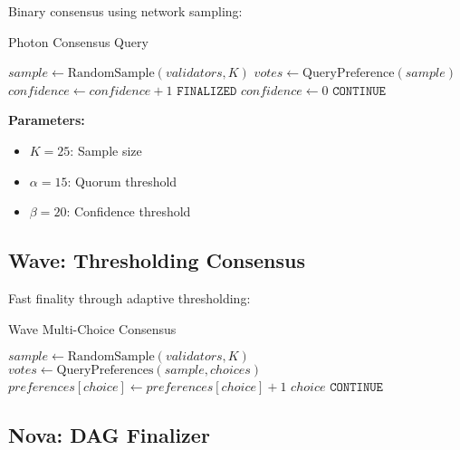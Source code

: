 \documentclass[11pt]{article}
\begin{document}
Binary consensus using network sampling:

\begin{algorithm}[H]
\caption{Photon Consensus Query}
\begin{algorithmic}[1]
    \State $sample \gets \text{RandomSample}(validators, K)$
    \State $votes \gets \text{QueryPreference}(sample)$
        \State $confidence \gets confidence + 1$
            \State \Return $\texttt{FINALIZED}$
        \EndIf
    \Else
        \State $confidence \gets 0$
    \EndIf
    \State \Return $\texttt{CONTINUE}$
\EndFunction
\end{algorithmic}
\end{algorithm}

\textbf{Parameters:}
\begin{itemize}
\item $K = 25$: Sample size
\item $\alpha = 15$: Quorum threshold
\item $\beta = 20$: Confidence threshold
\end{itemize}

\subsection{Wave: Thresholding Consensus}

Fast finality through adaptive thresholding:

\begin{algorithm}[H]
\caption{Wave Multi-Choice Consensus}
\begin{algorithmic}[1]
    \State $sample \gets \text{RandomSample}(validators, K)$
    \State $votes \gets \text{QueryPreferences}(sample, choices)$
            \State $preferences[choice] \gets preferences[choice] + 1$
                \State \Return $choice$ 
            \EndIf
        \EndIf
    \EndFor
    \State \Return $\texttt{CONTINUE}$
\EndFunction
\end{algorithmic}
\end{algorithm}

\subsection{Nova: DAG Finalizer}
\end{document}
